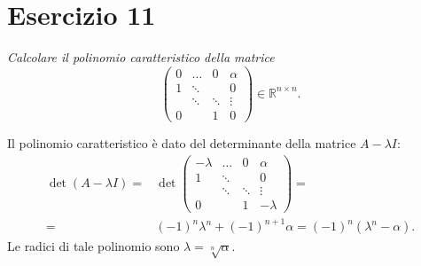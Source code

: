 \section{Esercizio 11}
\label{sub:es11}
\emph{Calcolare il polinomio caratteristico della matrice
			\[
				\begin{pmatrix}
					0 & \dots & 0 & \alpha\\
					1 & \ddots & & 0\\
					& \ddots & \ddots & \vdots\\
					0 & & 1 & 0
				\end{pmatrix}\in\mathbb{R}^{n\times n}.
			\]}
\begin{sol}
	\normalfont Il polinomio caratteristico è dato del determinante della matrice $A-\lambda I$:
	\begin{equation}
    \begin{split}\det{(A-\lambda I)}=&\det{\begin{pmatrix}-\lambda&\ldots&0&\alpha\\1&\ddots&&0\\&\ddots&\ddots&\vdots\\0&&1&-\lambda\end{pmatrix}}=\\=&(-1)^n\lambda^n+(-1)^{n+1}\alpha=(-1)^n(\lambda^n-\alpha).\end{split}
  \end{equation}
  Le radici di tale polinomio sono $\lambda=\sqrt[n]{\alpha}$.
\end{sol}


